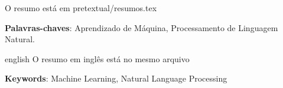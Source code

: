 
\setlength{\absparsep}{18pt} %
\begin{resumo}

O resumo está em pretextual/resumos.tex


 \textbf{Palavras-chaves}: Aprendizado de Máquina, Processamento de Linguagem Natural.
\end{resumo}

\begin{resumo}[Abstract]
 \begin{otherlanguage*}{english}
    O resumo em inglês está no mesmo arquivo

   \vspace{\onelineskip}
 
   \noindent 
   \textbf{Keywords}: Machine Learning, Natural Language Processing
 \end{otherlanguage*}
\end{resumo}